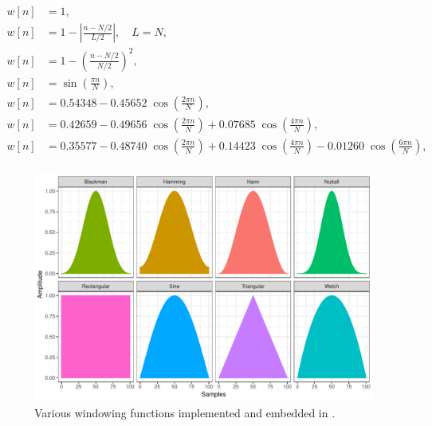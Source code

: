 \documentclass[a4paper,9pt]{extarticle}
\begin{document}
\begin{align}
  w[n] & = 1,
  \tag*{(rectangular)}                                                                                                                                        \\
  w[n] & = 1-\left|\tfrac {n-N/2}{L/2}\right|, \quad L=N,
  \tag*{(triangular/Bartlett)}                                                                                                                                \\
  w[n] & = 1-\left(\tfrac {n-N/2}{N/2}\right)^{2},
  \tag*{(Welch)}                                                                                                                                              \\
  w[n] & = \sin \left(\tfrac {\pi n}{N}\right),
  \tag*{(sine)}                                                                                                                                               \\
  w[n] & = 0.54348-0.45652\;\cos \left(\tfrac {2\pi n}{N}\right),
  \tag*{(Hamming)}                                                                                                                                            \\
  w[n] & = 0.42659-0.49656\;\cos \left(\tfrac {2\pi n}{N}\right)+0.07685\;\cos \left(\tfrac {4\pi n}{N}\right),
  \tag*{(Blackman)}                                                                                                                                           \\
  w[n] & = 0.35577-0.48740\;\cos \left(\tfrac {2\pi n}{N}\right)+0.14423\;\cos \left(\tfrac {4\pi n}{N}\right)-0.01260\;\cos \left(\tfrac {6\pi n}{N}\right),
  \tag*{(Nuttall)}                                                                                                                                            \\
  \label{eq.filter}
\end{align}
\begin{figure}[!h]
  \centering
  \includegraphics[width=\linewidth]{fig/filters.pdf}
  \caption{Various windowing functions implemented and embedded in \smashpp.}
  \label{fig.filters}
\end{figure}
\end{document}
